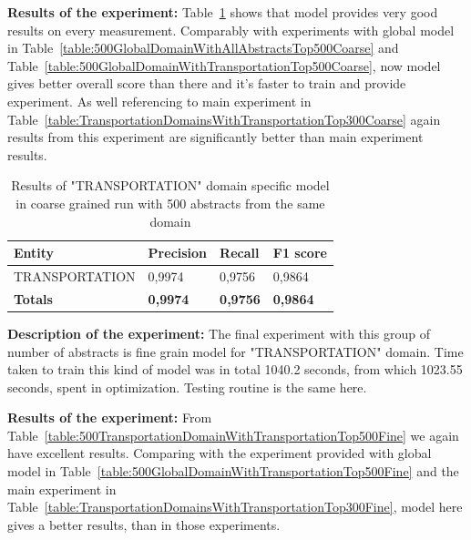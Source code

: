 \documentclass[thesis=M,english]{FITthesis}[2018/05/30]
\begin{document}
	\textbf{Results of the experiment:} Table~\ref{table:500TransportationDomainWithTransportationTop500Coarse} shows that model provides very good results on every measurement. Comparably with experiments with global model in Table~\ref{table:500GlobalDomainWithAllAbstractsTop500Coarse} and Table~\ref{table:500GlobalDomainWithTransportationTop500Coarse}, now model gives better overall score than there and it's faster to train and provide experiment. As well referencing to main experiment in Table~\ref{table:TransportationDomainsWithTransportationTop300Coarse} again results from this experiment are significantly better than main experiment results.


	\begin{table}[H]\centering
		\begin{tabular}{|l|l|l|l|}
			\hline {\textbf{Entity}} & {\textbf{Precision}} & {\textbf{Recall}} & {\textbf{F1 score}}\\\hline
				TRANSPORTATION & 0,9974 & 0,9756 & 0,9864\\\hline
				\textbf{Totals} & \textbf{0,9974} & \textbf{0,9756} & \textbf{0,9864}\\\hline
		\end{tabular}
		\caption{Results of "TRANSPORTATION" domain specific model in coarse grained run with 500 abstracts from the same domain \label{table:500TransportationDomainWithTransportationTop500Coarse}}
	\end{table}
	
	\textbf{Description of the experiment:} The final experiment with this group of number of abstracts is fine grain model for "TRANSPORTATION" domain. Time taken to train this kind of model was in total 1040.2 seconds, from which 1023.55 seconds, spent in optimization. Testing routine is the same here.

	\textbf{Results of the experiment:} From Table~\ref{table:500TransportationDomainWithTransportationTop500Fine} we again have excellent results. Comparing with the experiment provided with global model in Table~\ref{table:500GlobalDomainWithTransportationTop500Fine} and the main experiment in Table~\ref{table:TransportationDomainsWithTransportationTop300Fine}, model here gives a better results, than in those experiments.
	
\end{document}
